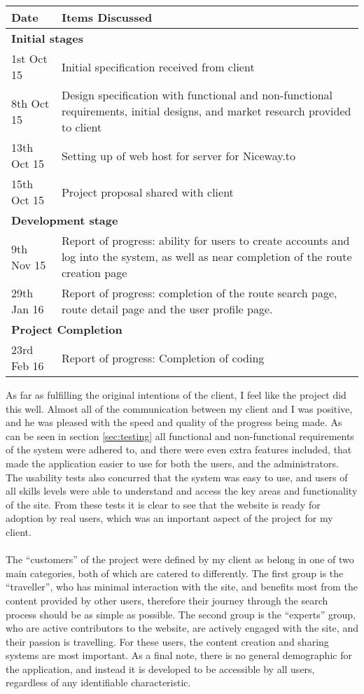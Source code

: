 \begin{center}
\begin{tabular}{p{2cm}|p{12cm}}
	\hline
	\textbf{Date} & \textbf{Items Discussed}\\
	\hline	
	\multicolumn{2}{l}{\textbf{Initial stages}}\\
	\hline
	1st Oct 15 & Initial specification received from client\\
	8th Oct 15 & Design specification with functional and non-functional requirements, initial designs, and market research provided to client\\	
	13th Oct 15 & Setting up of web host for server for Niceway.to \\
	15th Oct 15 & Project proposal shared with client \\
	\hline
	\multicolumn{2}{l}{\textbf{Development stage}}\\
	\hline
	9th Nov 15 & Report of progress: ability for users to create accounts and log into the system, as well as near completion of the route creation page \\
	29th Jan 16 & Report of progress: completion of the route search page, route detail page and the user profile page.\\
	\hline
	\multicolumn{2}{l}{\textbf{Project Completion}}\\	
	\hline		
	23rd Feb 16 & Report of progress: Completion of coding\\
	\hline	
	\end{tabular}	
\end{center}
\noindent 
As far as fulfilling the original intentions of the client, I feel like the project did this well. Almost all of the communication between my client and I was positive, and he was pleased with the speed and quality of the progress being made. As can be seen in section \ref{sec:testing} all functional and non-functional requirements of the system were adhered to, and there were even extra features included, that made the application easier to use for both the users, and the administrators. The usability tests also concurred that the system was easy to use, and users of all skills levels were able to understand and access the key areas and functionality of the site. From these tests it is clear to see that the website is ready for adoption by real users, which was an important aspect of the project for my client.\ \\
\ \\
The ``customers'' of the project were defined by my client as belong in one of two main categories, both of which are catered to differently. The first group is the ``traveller'', who has minimal interaction with the site, and benefits most from the content provided by other users, therefore their journey through the search process should be as simple as possible. The second group is the ``experts'' group, who are active contributors to the website, are actively engaged with the site, and their passion is travelling. For these users, the content creation and sharing systems are most important. As a final note, there is no general demographic for the application, and instead it is developed to be accessible by all users, regardless of any identifiable characteristic.